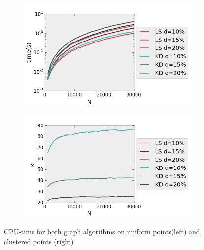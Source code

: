 \begin{figure}[H] 
  \begin{subfigure}[b]{0.5\linewidth}
    \centering
    \includegraphics[width=0.9\linewidth]{Pictures/unif_kd_ls_t} 
    \label{fig:kd_ls_k:a} 
    \vspace{4ex}
  \end{subfigure}%
  \begin{subfigure}[b]{0.5\linewidth}
    \centering
    \includegraphics[width=0.9\linewidth]{Pictures/unif_kd_ls_k} 
    \label{fig:kd_ls_k:b} 
    \vspace{4ex}
  \end{subfigure}
  \caption{CPU-time for both graph algorithms on uniform points(left) and clustered points (right)}
  \label{fig:kd_ls} 
\end{figure}

